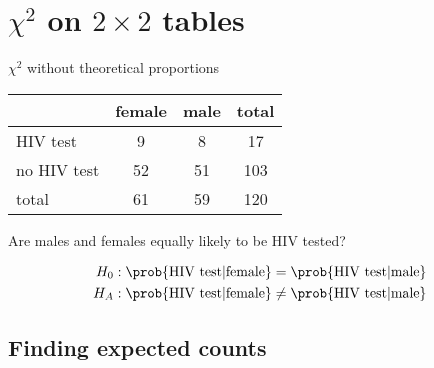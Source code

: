\section{$\chi^2$ on $2\times2$ tables}


\begin{frame}{$\chi^2$ without theoretical proportions}

    \begin{center}
        \begin{tabular}{lcc|c}
            & female & male & total \\
            \hline
            HIV test & 9 & 8 & 17 \\
            no HIV test & 52 & 51 & 103 \\
            \hline
            total & 61 & 59 & 120 \\
        \end{tabular}
    \end{center}


    \vspace{2em}

    Are males and females equally likely to be HIV tested?

    \vspace{2em}

    \begin{align*}
        H_0&: \prob\{ \text{HIV test} \vert \text{female} \} = \prob\{ \text{HIV test} \vert \text{male} \} \\
        H_A&: \prob\{ \text{HIV test} \vert \text{female} \} \neq \prob\{ \text{HIV test} \vert \text{male} \}
    \end{align*}

\end{frame}

\subsection{Finding expected counts}

